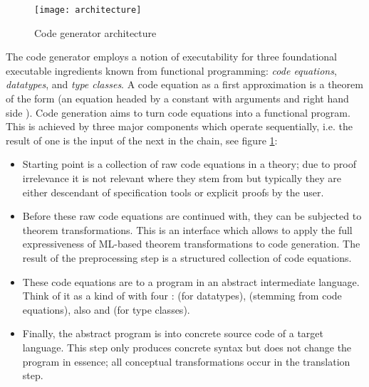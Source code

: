 \begin{isabellebody}
\begin{isamarkuptext}
  \begin{figure}[h]
    \texttt{[image: architecture]}
    \caption{Code generator architecture}
    \label{fig:arch}
  \end{figure}

  The code generator employs a notion of executability
  for three foundational executable ingredients known
  from functional programming:
  \emph{code equations}, \emph{datatypes}, and
  \emph{type classes}.  A code equation as a first approximation
  is a theorem of the form 
  (an equation headed by a constant  with arguments
   and right hand side ).
  Code generation aims to turn code equations
  into a functional program.  This is achieved by three major
  components which operate sequentially, i.e. the result of one is
  the input
  of the next in the chain,  see figure \ref{fig:arch}:

  \begin{itemize}

    \item Starting point is a collection of raw code equations in a
      theory; due to proof irrelevance it is not relevant where they
      stem from but typically they are either descendant of specification
      tools or explicit proofs by the user.
      
    \item Before these raw code equations are continued
      with, they can be subjected to theorem transformations.  This
       is an interface which allows to apply the full
      expressiveness of ML-based theorem transformations to code
      generation.  The result of the preprocessing step is a
      structured collection of code equations.

    \item These code equations are  to a program in an
      abstract intermediate language.  Think of it as a kind
      of  with four : 
      (for datatypes),  (stemming from code equations),
      also  and  (for type classes).

    \item Finally, the abstract program is  into concrete
      source code of a target language.
      This step only produces concrete syntax but does not change the
      program in essence; all conceptual transformations occur in the
      translation step.


\end{itemize}
\end{isamarkuptext}
\end{isabellebody}
